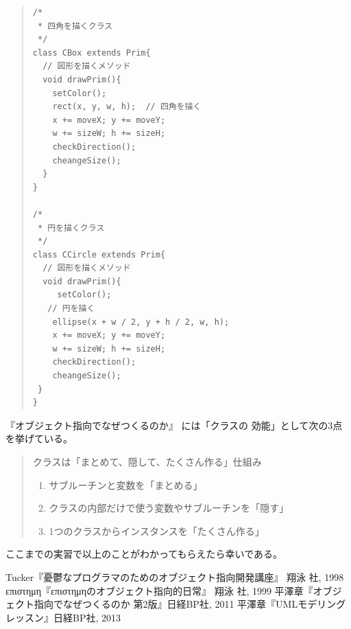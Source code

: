 \documentclass[uplatex,a4j,11pt]{jsarticle}
\renewcommand{\baselinestretch}{1.08}
\begin{document}
    \begin{quote}
	\begin{minipage}{\linewidth}
	 \begin{shadebox}
      \def\baselinestretch{.8}\selectfont
      \small
      \begin{verbatim}
/*
 * 四角を描くクラス
 */
class CBox extends Prim{
  // 図形を描くメソッド
  void drawPrim(){
    setColor();
    rect(x, y, w, h);  // 四角を描く
    x += moveX; y += moveY;
    w += sizeW; h += sizeH;
    checkDirection();
    cheangeSize();
  }  
}

/*
 * 円を描くクラス
 */
class CCircle extends Prim{
  // 図形を描くメソッド
  void drawPrim(){
     setColor();
   // 円を描く
    ellipse(x + w / 2, y + h / 2, w, h);
    x += moveX; y += moveY;
    w += sizeW; h += sizeH;
    checkDirection();
    cheangeSize();
 }  
}

      \end{verbatim}
     \end{shadebox}
    \end{minipage}
    \end{quote}


『オブジェクト指向でなぜつくるのか』\cite{073146_20Jul14} には「クラスの
効能」として次の3点を挙げている。

\begin{quotation}
 クラスは「まとめて、隠して、たくさん作る」仕組み
 \begin{enumerate}
  \item サブルーチンと変数を「まとめる」
  \item クラスの内部だけで使う変数やサブルーチンを「隠す」
  \item 1つのクラスからインスタンスを「たくさん作る」
 \end{enumerate}
\end{quotation}

ここまでの実習で以上のことがわかってもらえたら幸いである。


\begin{thebibliography}{99}
         Tucker『憂鬱なプログラマのためのオブジェクト指向開発講座』 翔泳
         社, 1998
         επιστημη『επιστημηのオブジェクト指向的日常』 翔泳
         社, 1999
         平澤章『オブジェクト指向でなぜつくるのか 第2版』日経BP社, 2011
         平澤章『UMLモデリングレッスン』日経BP社, 2013
\end{thebibliography}
\end{document}

